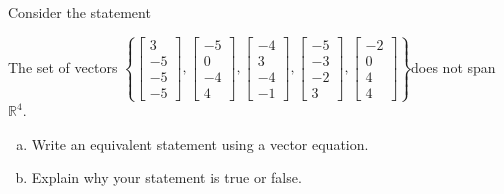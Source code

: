 
\begin{exerciseStatement}


Consider the statement 
\begin{center}\begin{minipage}{0.8\textwidth}
 The set of vectors \( \left\{ \left[\begin{array}{c}
3 \\
-5 \\
-5 \\
-5
\end{array}\right] , \left[\begin{array}{c}
-5 \\
0 \\
-4 \\
4
\end{array}\right] , \left[\begin{array}{c}
-4 \\
3 \\
-4 \\
-1
\end{array}\right] , \left[\begin{array}{c}
-5 \\
-3 \\
-2 \\
3
\end{array}\right] , \left[\begin{array}{c}
-2 \\
0 \\
4 \\
4
\end{array}\right] \right\} \)does not span \(\mathbb{R}^4\). 
\end{minipage}\end{center}
    


\begin{enumerate}[(a)]
\item  Write an equivalent statement using a vector equation.
\item  Explain why your statement is true or false.
\end{enumerate}
    
\end{exerciseStatement}
    
